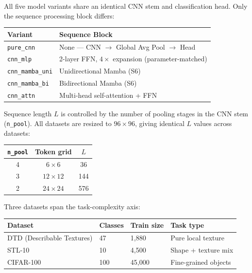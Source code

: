 \documentclass[11pt, a4paper]{article}
\begin{document}
All five model variants share an identical CNN stem and classification head.
Only the sequence processing block differs:

\begin{center}
\begin{tabular}{ll}
\toprule
\textbf{Variant} & \textbf{Sequence Block} \\
\midrule
\texttt{pure\_cnn}       & None — CNN $\to$ Global Avg Pool $\to$ Head \\
\texttt{cnn\_mlp}        & 2-layer FFN, $4\times$ expansion (parameter-matched) \\
\texttt{cnn\_mamba\_uni} & Unidirectional Mamba (S6) \\
\texttt{cnn\_mamba\_bi}  & Bidirectional Mamba (S6) \\
\texttt{cnn\_attn}       & Multi-head self-attention + FFN \\
\bottomrule
\end{tabular}
\end{center}

Sequence length $L$ is controlled by the number of pooling stages in the CNN stem
(\texttt{n\_pool}). All datasets are resized to $96\times96$, giving identical $L$
values across datasets:

\begin{center}
\begin{tabular}{ccc}
\toprule
\texttt{n\_pool} & Token grid & $L$ \\
\midrule
4 & $6\times6$   & 36  \\
3 & $12\times12$ & 144 \\
2 & $24\times24$ & 576 \\
\bottomrule
\end{tabular}
\end{center}

Three datasets span the task-complexity axis:

\begin{center}
\begin{tabular}{llll}
\toprule
\textbf{Dataset} & \textbf{Classes} & \textbf{Train size} & \textbf{Task type} \\
\midrule
DTD (Describable Textures) & 47  & 1,880  & Pure local texture \\
STL-10                     & 10  & 4,500  & Shape + texture mix \\
CIFAR-100                  & 100 & 45,000 & Fine-grained objects \\
\bottomrule
\end{tabular}
\end{center}
\end{document}
